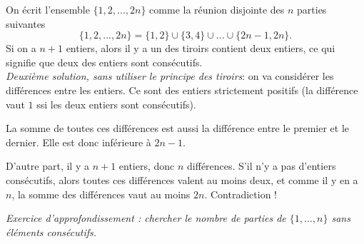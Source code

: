 \begin{Soln}{8}

On écrit l'ensemble $\{1,2,...,2n\}$ comme la réunion disjointe des $n$ parties suivantes
\[ \{1,2,...,2n\} = \{1,2 \} \cup \{3,4 \}\cup ... \cup \{2n-1,2n \}.\]
Si on a $n+1$ entiers, alors il y a un des \og tiroirs\fg{} contient deux entiers, ce qui signifie que deux des entiers sont consécutifs.\\

\emph{Deuxième solution, sans utiliser le principe des tiroirs}: on va considérer les différences entre les entiers. Ce sont des entiers strictement positifs (la différence vaut $1$ ssi les deux entiers sont consécutifs).

La somme de toutes ces différences est aussi la différence entre le premier et le dernier. Elle est donc inférieure à $2n-1$.

D'autre part, il y a $n+1$ entiers, donc $n$ différences. S'il n'y a pas d'entiers consécutifs, alors toutes ces différences valent au moins deux, et comme il y en a $n$, la somme des différences vaut au moins $2n$. Contradiction !

\emph{Exercice d'approfondissement : chercher le nombre de parties de $\{1, ..., n\}$ sans éléments consécutifs.}
\end{Soln}
